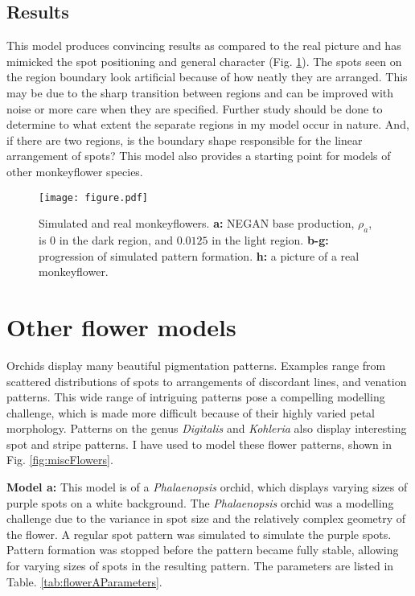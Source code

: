 \subsection*{Results}
This model produces convincing results as compared to the real picture and has mimicked the spot positioning and general character (Fig. \ref{fig:monkeyflower}). The spots seen on the region boundary look artificial because of how neatly they are arranged. This may be due to the sharp transition between regions and can be improved with noise or more care when they are specified. Further study should be done to determine to what extent the separate regions in my model occur in nature. And, if there are two regions, is the boundary shape responsible for the linear arrangement of spots? This model also provides a starting point for models of other monkeyflower species.

\begin{figure}[ht]
	\centering
	\texttt{[image: figure.pdf]}
	\caption[Simulated and real monkeyflowers]{Simulated and real monkeyflowers. \textbf{a:} NEGAN base production, $\rho_a$, is 0 in the dark region, and $0.0125$ in the light region. \textbf{b-g:} progression of simulated pattern formation. \textbf{h:} a picture of a real monkeyflower.}
	\label{fig:monkeyflower}
\end{figure}

\section{Other flower models}
Orchids display many beautiful pigmentation patterns. Examples range from scattered distributions of spots to arrangements of discordant lines, and venation patterns. This wide range of intriguing patterns pose a compelling modelling challenge, which is made more difficult because of their highly varied petal morphology. Patterns on the genus \textit{Digitalis} and \textit{Kohleria} also display interesting spot and stripe patterns. I have used \ProgramName{} to model these flower patterns, shown in Fig. \ref{fig:miscFlowers}.

\textbf{Model a:} 
This model is of a \textit{Phalaenopsis} orchid, which displays varying sizes of purple spots on a white background. The \textit{Phalaenopsis} orchid was a modelling challenge due to the variance in spot size and the relatively complex geometry of the flower. A regular spot pattern was simulated to simulate the purple spots. Pattern formation was stopped before the pattern became fully stable, allowing for varying sizes of spots in the resulting pattern. The parameters are listed in Table. \ref{tab:flowerAParameters}.

